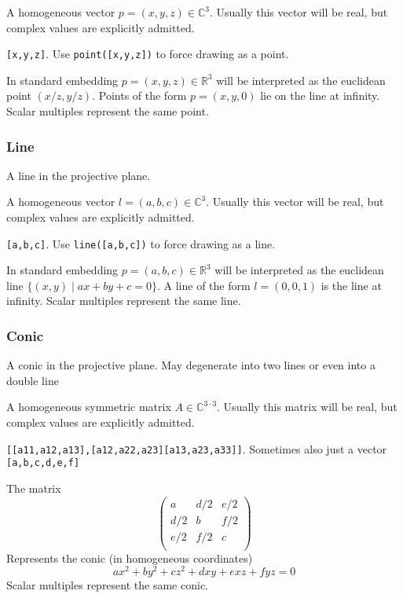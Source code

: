 \documentclass[11pt]{article}
\begin{document}
\medskip
{} A homogeneous vector $p=(x,y,z)\in\mathbb{C}^3$. Usually this vector will be real, but complex values are explicitly admitted.

\medskip
{} {\tt [x,y,z]}. Use {\tt point([x,y,z])} to force drawing as a point.

\medskip
{} In standard embedding $p=(x,y,z)\in\mathbb{R}^3$ will be interpreted as the euclidean point $(x/z,y/z)$. Points of the form $p=(x,y,0)$ lie on the line at infinity. Scalar multiples represent the same point.


\subsubsection{Line}
 A line in the projective plane.

\medskip
{} A homogeneous vector $l=(a,b,c)\in\mathbb{C}^3$. Usually this vector will be real, but complex values are explicitly admitted.

\medskip
{} {\tt [a,b,c]}. Use {\tt line([a,b,c])} to force drawing as a line.

\medskip
{} In standard embedding $p=(a,b,c)\in\mathbb{R}^3$ will be interpreted as the euclidean line $\{(x,y)\;\vert\; ax+by+c=0\}$. A line of the form $l=(0,0,1)$ is the line at infinity. Scalar multiples represent the same line.



\subsubsection{Conic}
 A conic in the projective plane. May degenerate into two lines or even into a double line


\medskip
{} A homogeneous symmetric matrix $A\in\mathbb{C}^{3\cdot 3}$. Usually this matrix will be real, but complex values are explicitly admitted.



\medskip
{} {\tt [[a11,a12,a13],[a12,a22,a23][a13,a23,a33]]}. Sometimes also just a vector {\tt [a,b,c,d,e,f]} 

\medskip
{} 
The matrix
\[
\begin{pmatrix}
a&d/2&e/2\\
d/2&b&f/2\\
e/2&f/2&c\\
\end{pmatrix}
\]
Represents the conic (in homogeneous coordinates)
\[
ax^2+by^2+cz^2+dxy+exz+fyz=0
\]
Scalar multiples represent the same conic.
\end{document}
